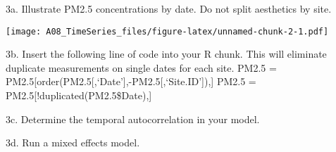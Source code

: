 \documentclass[]{article}
\newenvironment{Shaded}{\begin{snugshade}}{\end{snugshade}}
\newcommand{\KeywordTok}[1]{\textcolor[rgb]{0.13,0.29,0.53}{\textbf{#1}}}
\newcommand{\DataTypeTok}[1]{\textcolor[rgb]{0.13,0.29,0.53}{#1}}
\newcommand{\DecValTok}[1]{\textcolor[rgb]{0.00,0.00,0.81}{#1}}
\newcommand{\FloatTok}[1]{\textcolor[rgb]{0.00,0.00,0.81}{#1}}
\newcommand{\StringTok}[1]{\textcolor[rgb]{0.31,0.60,0.02}{#1}}
\newcommand{\CommentTok}[1]{\textcolor[rgb]{0.56,0.35,0.01}{\textit{#1}}}
\newcommand{\OperatorTok}[1]{\textcolor[rgb]{0.81,0.36,0.00}{\textbf{#1}}}
\newcommand{\NormalTok}[1]{#1}
\begin{document}
3a. Illustrate PM2.5 concentrations by date. Do not split aesthetics by
site.

\begin{Shaded}
\end{Shaded}

\texttt{[image: A08\_TimeSeries\_files/figure-latex/unnamed-chunk-2-1.pdf]}

3b. Insert the following line of code into your R chunk. This will
eliminate duplicate measurements on single dates for each site. PM2.5 =
PM2.5{[}order(PM2.5{[},`Date'{]},-PM2.5{[},`Site.ID'{]}),{]} PM2.5 =
PM2.5{[}!duplicated(PM2.5\$Date),{]}

3c. Determine the temporal autocorrelation in your model.

3d. Run a mixed effects model.

\begin{Shaded}
\end{Shaded}
\end{document}
